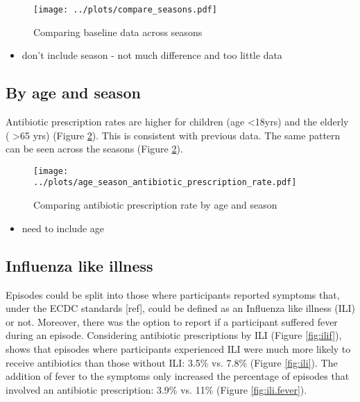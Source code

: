 \documentclass{article}
\begin{document}
	\begin{figure}[htbp]
		\centering
		\texttt{[image: ../plots/compare\_seasons.pdf]}
		\caption{Comparing baseline data across seasons}
		\label{fig:compareseasons}
	\end{figure} 

\begin{itemize}
	\item don't include season - not much difference and too little data
\end{itemize}

\subsection{By age and season}

Antibiotic prescription rates are higher for children (age \textless 18yrs) and the elderly ( \textgreater 65 yrs) (Figure \ref{fig:ageseason}). This is consistent with previous data. The same pattern can be seen across the seasons (Figure \ref{fig:ageseason}). 

	\begin{figure}[htbp]
		\centering
		\texttt{[image: ../plots/age\_season\_antibiotic\_prescription\_rate.pdf]}
		\caption{Comparing antibiotic prescription rate by age and season}
		\label{fig:ageseason}
	\end{figure} 

\begin{itemize}
	\item need to include age
\end{itemize}

\subsection{Influenza like illness}

Episodes could be split into those where participants reported symptoms that, under the ECDC standards [ref], could be defined as an Influenza like illness (ILI) or not. Moreover, there was the option to report if a participant suffered fever during an episode. Considering antibiotic prescriptions by ILI (Figure \ref{fig:ilif}), shows that episodes where participants experienced ILI were much more likely to receive antibiotics than those without ILI: 3.5\% vs. 7.8\% (Figure \ref{fig:ili}). The addition of fever to the symptoms only increased the percentage of episodes that involved an antibiotic prescription: 3.9\% vs. 11\% (Figure \ref{fig:ili.fever}).
\end{document}

